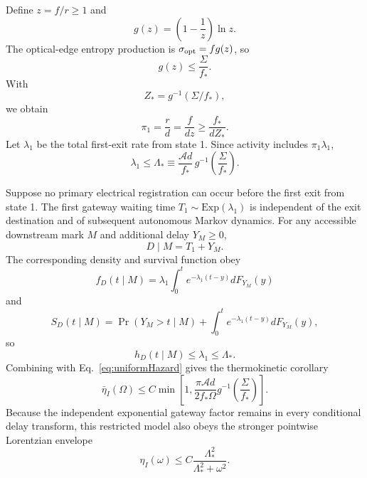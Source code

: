 \documentclass[aps,prapplied,preprint,nofootinbib]{revtex4-2}
\begin{document}
Define $z=f/r\ge1$ and
\begin{equation}
g(z)=\left(1-\frac{1}{z}\right)\ln z.
\end{equation}
The optical-edge entropy production is $\sigma_{\rm opt}=f g(z)$, so
\begin{equation}
g(z)\le\frac{\Sigma}{f_*}.
\end{equation}
With
\begin{equation}
Z_*=g^{-1}(\Sigma/f_*),
\end{equation}
we obtain
\begin{equation}
\pi_1=\frac{r}{d}=\frac{f}{dz}
\ge\frac{f_*}{dZ_*}.
\label{eq:pi1}
\end{equation}
Let $\lambda_1$ be the total first-exit rate from state 1.  Since activity includes $\pi_1\lambda_1$,
\begin{equation}
\boxed{
\lambda_1\le
\Lambda_*
\equiv
\frac{\mathcal A d}{f_*}
\,g^{-1}\!\left(\frac{\Sigma}{f_*}\right).}
\label{eq:Lstar}
\end{equation}

Suppose no primary electrical registration can occur before the first exit from state 1.  The first gateway waiting time $T_1\sim\mathrm{Exp}(\lambda_1)$ is independent of the exit destination and of subsequent autonomous Markov dynamics.  For any accessible downstream mark $M$ and additional delay $Y_M\ge0$,
\begin{equation}
D\mid M=T_1+Y_M.
\end{equation}
The corresponding density and survival function obey
\begin{equation}
f_D(t\mid M)
=\lambda_1\int_0^t e^{-\lambda_1(t-y)}dF_{Y_M}(y)
\end{equation}
and
\begin{equation}
S_D(t\mid M)
=\Pr(Y_M>t\mid M)+
\int_0^t e^{-\lambda_1(t-y)}dF_{Y_M}(y),
\end{equation}
so
\begin{equation}
\boxed{h_D(t\mid M)\le\lambda_1\le\Lambda_*.}
\label{eq:hazardBridge}
\end{equation}
Combining with Eq.~\eqref{eq:uniformHazard} gives the thermokinetic corollary
\begin{equation}
\boxed{
\bar\eta_I(\Omega)
\le
C\min\left[
1,
\frac{\pi\mathcal A d}{2f_*\Omega}
 g^{-1}\!\left(\frac{\Sigma}{f_*}\right)
\right].}
\label{eq:thermoBound}
\end{equation}
Because the independent exponential gateway factor remains in every conditional delay transform, this restricted model also obeys the stronger pointwise Lorentzian envelope
\begin{equation}
\eta_I(\omega)
\le
C\frac{\Lambda_*^2}{\Lambda_*^2+\omega^2}.
\label{eq:lorentzian}
\end{equation}
\end{document}
